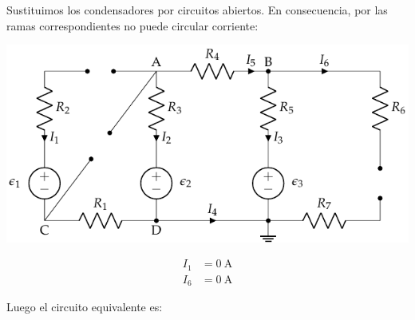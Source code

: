\documentclass[10pt]{article}
\begin{document}
Sustituimos los condensadores por circuitos abiertos. En consecuencia, por las ramas correspondientes no puede circular corriente:

\vspace{2mm}
\begin{minipage}{0.75\linewidth}
  \includegraphics[scale=1.2]{figs/nudos_condensadores2.pdf}
\end{minipage}
\begin{minipage}{0.25\linewidth}
    \begin{align*}
      I_1 &= \qty{0}{\ampere}\\
      I_6 &= \qty{0}{\ampere}
    \end{align*}    
\end{minipage}

\vspace{6mm}

Luego el circuito equivalente es:
\end{document}
